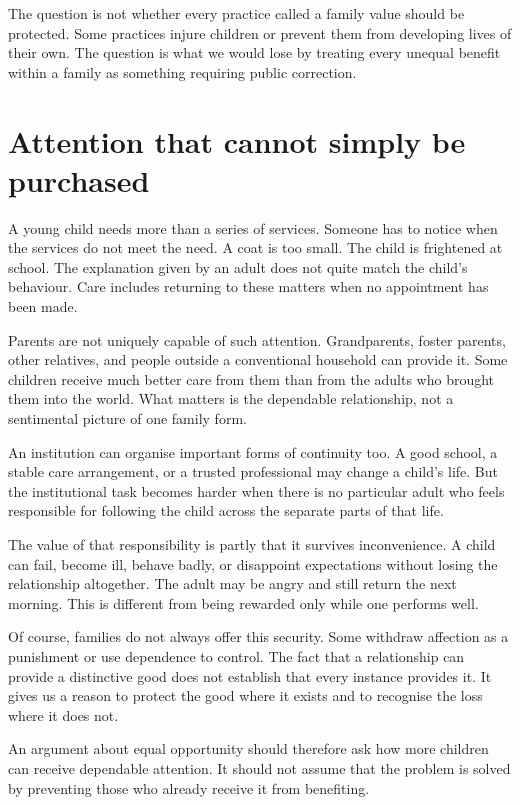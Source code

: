\documentclass[12pt,a4paper]{book}
\begin{document}
The question is not whether every practice called a family value should be protected. Some practices injure children or prevent them from developing lives of their own. The question is what we would lose by treating every unequal benefit within a family as something requiring public correction.

\section*{Attention that cannot simply be purchased}

A young child needs more than a series of services. Someone has to notice when the services do not meet the need. A coat is too small. The child is frightened at school. The explanation given by an adult does not quite match the child's behaviour. Care includes returning to these matters when no appointment has been made.

Parents are not uniquely capable of such attention. Grandparents, foster parents, other relatives, and people outside a conventional household can provide it. Some children receive much better care from them than from the adults who brought them into the world. What matters is the dependable relationship, not a sentimental picture of one family form.

An institution can organise important forms of continuity too. A good school, a stable care arrangement, or a trusted professional may change a child's life. But the institutional task becomes harder when there is no particular adult who feels responsible for following the child across the separate parts of that life.

The value of that responsibility is partly that it survives inconvenience. A child can fail, become ill, behave badly, or disappoint expectations without losing the relationship altogether. The adult may be angry and still return the next morning. This is different from being rewarded only while one performs well.

Of course, families do not always offer this security. Some withdraw affection as a punishment or use dependence to control. The fact that a relationship can provide a distinctive good does not establish that every instance provides it. It gives us a reason to protect the good where it exists and to recognise the loss where it does not.

An argument about equal opportunity should therefore ask how more children can receive dependable attention. It should not assume that the problem is solved by preventing those who already receive it from benefiting.
\end{document}
